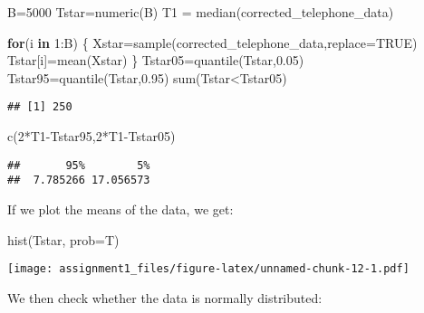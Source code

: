 \documentclass[
]{article}
\newenvironment{Shaded}{\begin{snugshade}}{\end{snugshade}}
\newcommand{\AttributeTok}[1]{\textcolor[rgb]{0.77,0.63,0.00}{#1}}
\newcommand{\ConstantTok}[1]{\textcolor[rgb]{0.00,0.00,0.00}{#1}}
\newcommand{\ControlFlowTok}[1]{\textcolor[rgb]{0.13,0.29,0.53}{\textbf{#1}}}
\newcommand{\DecValTok}[1]{\textcolor[rgb]{0.00,0.00,0.81}{#1}}
\newcommand{\FloatTok}[1]{\textcolor[rgb]{0.00,0.00,0.81}{#1}}
\newcommand{\FunctionTok}[1]{\textcolor[rgb]{0.00,0.00,0.00}{#1}}
\newcommand{\NormalTok}[1]{#1}
\newcommand{\OtherTok}[1]{\textcolor[rgb]{0.56,0.35,0.01}{#1}}
\newcommand{\SpecialCharTok}[1]{\textcolor[rgb]{0.00,0.00,0.00}{#1}}
\begin{document}
\begin{Shaded}
\begin{Highlighting}[]
\NormalTok{B}\OtherTok{=}\DecValTok{5000}
\NormalTok{Tstar}\OtherTok{=}\FunctionTok{numeric}\NormalTok{(B)}
\NormalTok{T1 }\OtherTok{=} \FunctionTok{median}\NormalTok{(corrected\_telephone\_data)}

\ControlFlowTok{for}\NormalTok{(i }\ControlFlowTok{in} \DecValTok{1}\SpecialCharTok{:}\NormalTok{B) \{}
\NormalTok{  Xstar}\OtherTok{=}\FunctionTok{sample}\NormalTok{(corrected\_telephone\_data,}\AttributeTok{replace=}\ConstantTok{TRUE}\NormalTok{)}
\NormalTok{  Tstar[i]}\OtherTok{=}\FunctionTok{mean}\NormalTok{(Xstar) }
\NormalTok{  \}}
\NormalTok{Tstar05}\OtherTok{=}\FunctionTok{quantile}\NormalTok{(Tstar,}\FloatTok{0.05}\NormalTok{)}
\NormalTok{Tstar95}\OtherTok{=}\FunctionTok{quantile}\NormalTok{(Tstar,}\FloatTok{0.95}\NormalTok{)}
\FunctionTok{sum}\NormalTok{(Tstar}\SpecialCharTok{\textless{}}\NormalTok{Tstar05)}
\end{Highlighting}
\end{Shaded}

\begin{verbatim}
## [1] 250
\end{verbatim}

\begin{Shaded}
\begin{Highlighting}[]
\FunctionTok{c}\NormalTok{(}\DecValTok{2}\SpecialCharTok{*}\NormalTok{T1}\SpecialCharTok{{-}}\NormalTok{Tstar95,}\DecValTok{2}\SpecialCharTok{*}\NormalTok{T1}\SpecialCharTok{{-}}\NormalTok{Tstar05)}
\end{Highlighting}
\end{Shaded}

\begin{verbatim}
##       95%        5% 
##  7.785266 17.056573
\end{verbatim}

If we plot the means of the data, we get:

\begin{Shaded}
\begin{Highlighting}[]
\FunctionTok{hist}\NormalTok{(Tstar, }\AttributeTok{prob=}\NormalTok{T)}
\end{Highlighting}
\end{Shaded}

\texttt{[image: assignment1\_files/figure-latex/unnamed-chunk-12-1.pdf]}

We then check whether the data is normally distributed:
\end{document}
